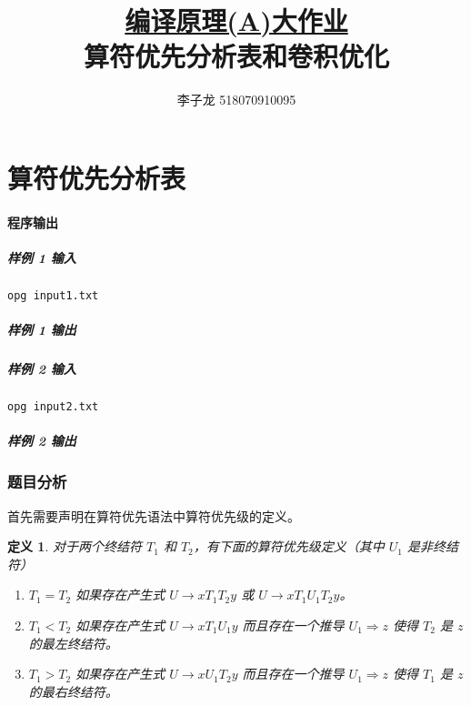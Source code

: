 \documentclass[UTF8]{ctexart}
\title{\normalsize\underline{编译原理(A)大作业}\\\Large 算符优先分析表和卷积优化}
\author{李子龙 518070910095}
\newtheorem{definition}{定义}
\begin{document}
    \maketitle
    \tableofcontents
    \clearpage

\part{算符优先分析表}
\subsection*{程序输出}
\subsubsection*{样例 1 输入}
\begin{lstlisting}[frameround=fttt]
opg input1.txt
\end{lstlisting}

\subsubsection*{样例 1 输出}

\subsubsection*{样例 2 输入}
\begin{lstlisting}[frameround=fttt]
opg input2.txt
\end{lstlisting}

\subsubsection*{样例 2 输出}


\section{题目分析}

首先需要声明在算符优先语法中算符优先级的定义\cite{Floyd1963}。
\begin{definition}\label{def:op}
    对于两个终结符 $T_1$ 和 $T_2$，有下面的算符优先级定义（其中 $U_1$ 是非终结符）
    \begin{enumerate}
        \item $T_1=T_2$ 如果存在产生式 $U\rightarrow xT_1T_2y$ 或 $U\rightarrow xT_1 U_1 T_2 y$。
        \item $T_1<T_2$ 如果存在产生式 $U\rightarrow xT_1U_1y$ 而且存在一个推导 $U_1\Rightarrow z$ 使得 $T_2$ 是 $z$ 的最左终结符。
        \item $T_1>T_2$ 如果存在产生式 $U\rightarrow xU_1T_2y$ 而且存在一个推导 $U_1\Rightarrow z$ 使得 $T_1$ 是 $z$ 的最右终结符。
    \end{enumerate}
\end{definition}
\end{document}
